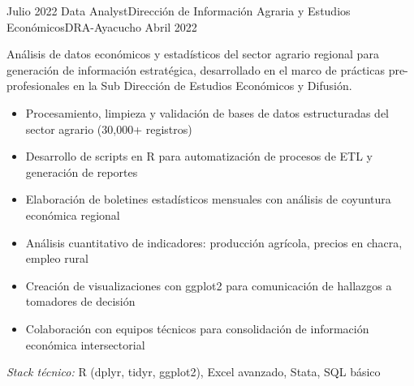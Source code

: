 \experience
{Julio 2022} {Data Analyst}{Dirección de Información Agraria y Estudios Económicos}{DRA-Ayacucho}
{Abril 2022} {
	Análisis de datos económicos y estadísticos del sector agrario regional para generación de información estratégica, desarrollado en el marco de prácticas pre-profesionales en la Sub Dirección de Estudios Económicos y Difusión.
	\begin{itemize}
		\item Procesamiento, limpieza y validación de bases de datos estructuradas del sector agrario (30,000+ registros)
		\item Desarrollo de scripts en R para automatización de procesos de ETL y generación de reportes
		\item Elaboración de boletines estadísticos mensuales con análisis de coyuntura económica regional
		\item Análisis cuantitativo de indicadores: producción agrícola, precios en chacra, empleo rural
		\item Creación de visualizaciones con ggplot2 para comunicación de hallazgos a tomadores de decisión
		\item Colaboración con equipos técnicos para consolidación de información económica intersectorial
	\end{itemize}
}
{\footnotesize{\emph{Stack técnico:} R (dplyr, tidyr, ggplot2), Excel avanzado, Stata, SQL básico}}
